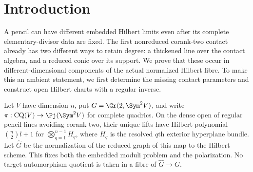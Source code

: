 \begin{abstract}
We determine formal contact neighbourhoods and open charts of the
Hilbert boundary of regular symmetric pencils. At a corank-two contact
with Smith exponents $a\leq b$, the full contact base has $2a+b$
parameters. Euclidean division gives an open chart of the ambient
Hilbert graph, rather than a selected family of limits. Its fibres
obey an exact greatest-common-divisor law, describing collisions and
simultaneous thick tails with unequal multiplicities. Over a fixed
pencil the primitive line-tail locus is the product of jet schemes
$J_{a_i-1}(\mathbf P^1)$. At one contact of type $(2,2)$ the actual
normalized Hilbert fibre is reducible and non-equidimensional: it has
a two-dimensional component with this jet open and a distinct component
of dimension at least four, containing reduced conic-tail limits.
The construction uses an exact multiplication-ideal identity over
arbitrary complex algebras. The full reduced-incidence modification,
all-order contact slices, singular-pencil invariants and earlier
reciprocal-fibre theory are retained with their proofs.
\end{abstract}
\maketitle
\section{Introduction}
\label{sec:paper-ii-v162}
A pencil can have different embedded Hilbert limits even after its
complete elementary-divisor data are fixed. The first nonreduced
corank-two contact already has two different ways to retain degree:
a thickened line over the contact algebra, and a reduced conic over
its support. We prove that these occur in different-dimensional
components of the actual normalized Hilbert fibre. To make this an
ambient statement, we first determine the missing contact parameters
and construct open Hilbert charts with a regular inverse.

Let $V$ have dimension $n$, put $G=\Gr(2,\Sym^2V)$, and write
$\pi:\mathrm{CQ}(V)\to\Pj(\Sym^2V)$ for complete quadrics.
On the dense open of regular pencil lines avoiding corank two, their
unique lifts have Hilbert polynomial $\binom n2 l+1$ for
$\bigotimes_{q=1}^{n-1}H_q$, where $H_q$ is the resolved $q$th
exterior hyperplane bundle. Let $\widehat G$ be the normalization
of the reduced graph of this map to the Hilbert scheme. This fixes
both the embedded moduli problem and the polarization. No target
automorphism quotient is taken in a fibre of $\widehat G\to G$.

